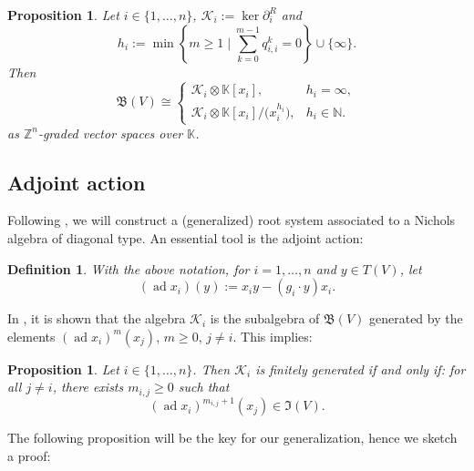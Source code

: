 \documentclass[10pt,a4paper]{amsart}
\numberwithin{equation}{section}
\newtheorem{Proposition}[Theorem]{Proposition}
\newtheorem{Definition}[Theorem]{Definition}
\newcommand{\NN }{\mathbb{N}}
\newcommand{\ZZ }{\mathbb{Z}}
\newcommand{\KK }{\mathbb{K}}
\newcommand{\der }{\partial^R}
\newcommand{\BB }{\mathfrak{B}}
\newcommand{\II }{\mathfrak{I}}
\newcommand{\Kc }{\mathcal{K}}
\DeclareMathOperator{\ad}{ad}
\begin{document}
\begin{Proposition}
Let $i\in\{1,\dots,n\}$, $\Kc_i:=\ker \der_i$ and
\[ h_i := \min\left\{ m\ge 1 \mid \sum_{k=0}^{m-1} q_{i,i}^k =0\right\} \cup \{\infty\}. \]
Then
\[ \BB(V) \cong \begin{cases}
\Kc_i\otimes \KK[x_i], & h_i = \infty, \\
\Kc_i\otimes \KK[x_i]/\big(x_i^{h_i}\big), & h_i \in \NN.
\end{cases} \]
as $\ZZ^n$-graded vector spaces over $\KK$.
\end{Proposition}

\subsection{Adjoint action}

Following \cite{p-H-06}, we will construct a (generalized) root system associated to a Nichols algebra of diagonal type.
An essential tool is the adjoint action:

\begin{Definition}With the above notation, for $i=1,\dots,n$ and $y\in T(V)$, let
\[ (\ad x_i)(y) := x_i y - (g_i\cdot y) x_i. \]
\end{Definition}

In \cite[Proposition~1]{p-H-06}, it is shown that the algebra $\Kc_i$ is the subalgebra of $\BB(V)$ generated by the elements $(\ad x_i)^m(x_j)$, $m\ge 0$, $j\ne i$. This implies:

\begin{Proposition}\label{Ki_fg}
Let $i\in\{1,\dots,n\}$. Then $\Kc_i$ is finitely generated if and only if: for all $j\ne i$, there exists $m_{i,j}\ge 0$ such that
\[ (\ad x_i)^{m_{i,j}+1}(x_j) \in \II(V). \]
\end{Proposition}

The following proposition will be the key for our generalization, hence we sketch a proof:
\end{document}
